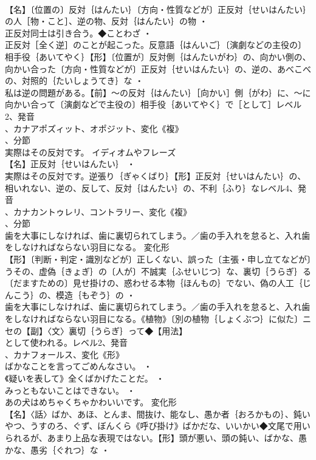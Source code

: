 \documentclass[8pt]{extreport}
\begin{document}
\begin{CJK}{UTF8}{min}
\\	【名】〔位置の〕反対｛はんたい｝〔方向・性質などが〕正反対｛せいはんたい｝の人［物・こと］、逆の物、反対｛はんたい｝の物 ・
\\	正反対同士は引き合う。◆ことわざ ・
\\	正反対［全く逆］のことが起こった。反意語｛はんいご｝〔演劇などの主役の〕相手役｛あいてやく｝【形】〔位置が〕反対側｛はんたいがわ｝の、向かい側の、向かい合った〔方向・性質などが〕正反対｛せいはんたい｝の、逆の、あべこべの、対照的｛たいしょうてき｝な ・
\\	私は逆の問題がある。【前】～の反対｛はんたい｝［向かい］側｛がわ｝に、～に向かい合って〔演劇などで主役の〕相手役｛あいてやく｝で［として］レベル2、発音
\\	、カナアポズィット、オポジット、変化《複》
\\	、分節
\\	実際はその反対です。	イディオムやフレーズ 
\\	【名】正反対｛せいはんたい｝ ・
\\	実際はその反対です。逆張り｛ぎゃくばり｝【形】正反対｛せいはんたい｝の、相いれない、逆の、反して、反対｛はんたい｝の、不利｛ふり｝なレベル4、発音
\\	、カナカントゥレリ、コントラリー、変化《複》
\\	、分節
\\	歯を大事にしなければ、歯に裏切られてしまう。／歯の手入れを怠ると、入れ歯
\\	をしなければならない羽目になる。	変化形 
\\	【形】〔判断・判定・識別などが〕正しくない、誤った〔主張・申し立てなどが〕うその、虚偽｛きょぎ｝の〔人が〕不誠実｛ふせいじつ｝な、裏切｛うらぎ｝る〔だますための〕見せ掛けの、惑わせる本物｛ほんもの｝でない、偽の人工｛じんこう｝の、模造｛もぞう｝の ・
\\	歯を大事にしなければ、歯に裏切られてしまう。／歯の手入れを怠ると、入れ歯
\\	をしなければならない羽目になる。《植物》〔別の植物｛しょくぶつ｝に似た〕ニセの【副】〈文〉裏切｛うらぎ｝って◆【用法】
\\	として使われる。レベル2、発音
\\	、カナフォールス、変化《形》
\\	ばかなことを言ってごめんなさい。 ・
\\	《疑いを表して》全くばかげたことだ。 ・
\\	みっともないことはできない。 ・
\\	あの犬はめちゃくちゃかわいいです。	変化形 
\\	【名】〈話〉ばか、あほ、とんま、間抜け、能なし、愚か者｛おろかもの｝、鈍いやつ、うすのろ、ぐず、ぼんくら《呼び掛け》ばかだな、いいかい◆文尾で用いられるが、あまり上品な表現ではない。【形】頭が悪い、頭の鈍い、ばかな、愚かな、愚劣｛ぐれつ｝な ・

\end{CJK}
\end{document}
